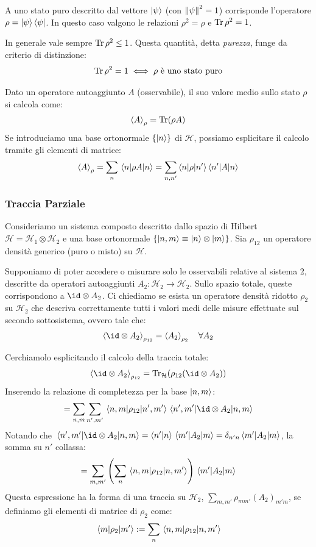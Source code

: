 A uno stato puro descritto dal vettore $\ket{\psi}$ (con $\norm{\psi}^2=1$) corrisponde l'operatore $\rho = \ket{\psi}\bra{\psi}$.
In questo caso valgono le relazioni $\rho^2 = \rho$ e $\Tr \rho^2 = 1$.

In generale vale sempre $\Tr \rho^2 \leq 1$. Questa quantità, detta \textit{purezza}, funge da criterio di distinzione:
\[
    \Tr \rho^2 = 1 \iff \rho \text{ è uno stato puro}
\]

Dato un operatore autoaggiunto $A$ (osservabile), il suo valore medio sullo stato $\rho$ si calcola come:
\begin{equation}
    \ev{A}_\rho = \Tr(\rho A)
\end{equation}
Se introduciamo una base ortonormale $\{\ket{n}\}$ di $\mathcal{H}$, possiamo esplicitare il calcolo tramite gli elementi di matrice:
\[
    \ev{A}_\rho = \sum_n \mel{n}{\rho A}{n} = \sum_{n,n'} \braket{n}{\rho|n'} \braket{n'}{A|n}
\]




\subsubsection{Traccia Parziale}

Consideriamo un sistema composto descritto dallo spazio di Hilbert \( \mathcal{H} = \mathcal{H}_1 \otimes \mathcal{H}_2 \) e una base ortonormale \( \{\ket{n,m} \equiv \ket{n}\otimes\ket{m}\} \). Sia \( \rho_{12} \) un operatore densità generico (puro o misto) su \( \mathcal{H} \).

Supponiamo di poter accedere o misurare solo le osservabili relative al sistema 2, descritte da operatori autoaggiunti \( A_2: \mathcal{H}_2 \to \mathcal{H}_2 \). Sullo spazio totale, queste corrispondono a \( \id \otimes A_2 \).
Ci chiediamo se esista un operatore densità ridotto \( \rho_2 \) su \( \mathcal{H}_2 \) che descriva correttamente tutti i valori medi delle misure effettuate sul secondo sottosistema, ovvero tale che:
\begin{equation}
    \ev{\id \otimes A_2}_{\rho_{12}} = \ev{A_2}_{\rho_2} \quad \forall A_2
\end{equation}

Cerchiamolo esplicitando il calcolo della traccia totale:
\[
    \ev{\id \otimes A_2}_{\rho_{12}} = \Tr_{\mathcal{H}}(\rho_{12} (\id \otimes A_2))
\]
Inserendo la relazione di completezza per la base \( \ket{n,m} \):
\[
    = \sum_{n,m} \sum_{n',m'} \mel{n,m}{\rho_{12}}{n',m'} \mel{n',m'}{\id \otimes A_2}{n,m}
\]
Notando che \( \mel{n',m'}{\id \otimes A_2}{n,m} = \braket{n'}{n}\mel{m'}{A_2}{m} = \delta_{n'n}\mel{m'}{A_2}{m} \), la somma su \( n' \) collassa:
\[
    = \sum_{m,m'} \left( \sum_n \mel{n,m}{\rho_{12}}{n,m'} \right) \mel{m'}{A_2}{m}
\]
Questa espressione ha la forma di una traccia su \( \mathcal{H}_2 \), \( \sum_{m,m'} \rho_{mm'} (A_2)_{m'm} \), se definiamo gli elementi di matrice di \( \rho_2 \) come:
\begin{equation}
    \mel{m}{\rho_2}{m'} := \sum_n \mel{n,m}{\rho_{12}}{n,m'}
\end{equation}

